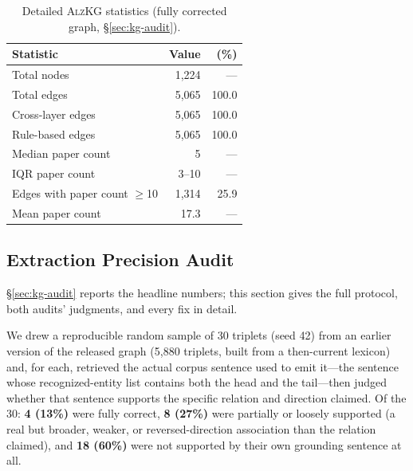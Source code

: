\documentclass{article}
\begin{document}
\begin{table}[h]
\centering
\caption{Detailed \textsc{AlzKG} statistics (fully corrected graph, \S\ref{sec:kg-audit}).}
\label{tab:kg-detailed}
\small
\begin{tabular}{lrr}
\toprule
\textbf{Statistic} & \textbf{Value} & \textbf{(\%)} \\
\midrule
Total nodes & 1{,}224 & --- \\
Total edges & 5{,}065 & 100.0 \\
Cross-layer edges & 5{,}065 & 100.0 \\
Rule-based edges & 5{,}065 & 100.0 \\
\midrule
Median paper count & 5 & --- \\
IQR paper count & 3--10 & --- \\
Edges with paper count $\geq$10 & 1{,}314 & 25.9 \\
Mean paper count & 17.3 & --- \\
\bottomrule
\end{tabular}
\end{table}

\subsection{Extraction Precision Audit}
\label{app:audit}
\S\ref{sec:kg-audit} reports the headline numbers; this section gives the full protocol, both audits' judgments, and every fix in detail.

We drew a reproducible random sample of 30 triplets (seed 42) from an earlier version of the released graph (5{,}880 triplets, built from a then-current lexicon) and, for each, retrieved the actual corpus sentence used to emit it---the sentence whose recognized-entity list contains both the head and the tail---then judged whether that sentence supports the specific relation and direction claimed. Of the 30: \textbf{4 (13\%)} were fully correct, \textbf{8 (27\%)} were partially or loosely supported (a real but broader, weaker, or reversed-direction association than the relation claimed), and \textbf{18 (60\%)} were not supported by their own grounding sentence at all.
\end{document}
